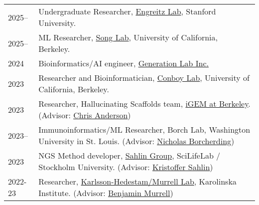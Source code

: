 
\begin{longtable}[l]{@{}p{} p{}}

    2025-- & Undergraduate Researcher, \href{https://www.engreitzlab.org/}{Engreitz Lab}, Stanford University. \\

    2025-- & ML Researcher, \href{https://people.eecs.berkeley.edu/~yss/}{Song Lab}, University of California, Berkeley. \\

    2024 & Bioinformatics/AI engineer, \href{https://www.generationlab.com/}{Generation Lab Inc.} \\

    2023 & Researcher and Bioinformatician, \href{https://conboylab.berkeley.edu/}{Conboy Lab}, University of California, Berkeley. \\

    2023 & Researcher, Hallucinating Scaffolds team, \href{https://igem.studentorg.berkeley.edu/teams/hallucinating-scaffolds/}{iGEM at Berkeley}. (Advisor: \href{https://vcresearch.berkeley.edu/faculty/chris-anderson}{Chris Anderson}) \\

    2023-- & Immunoinformatics/ML Researcher, Borch Lab, Washington University in St. Louis. (Advisor: \href{https://www.borch.dev/}{Nicholas Borcherding}) \\

    2023 & NGS Method developer, \href{https://sahlingroup.github.io/}{Sahlin Group}, SciLifeLab / Stockholm University. (Advisor: \href{https://www.scilifelab.se/researchers/kristoffer-sahlin/}{Kristoffer Sahlin}) \\

    2022-23 & Researcher, \href{https://ki.se/en/people/benjamin-murrell}{Karlsson-Hedestam/Murrell Lab}, Karolinska Institute. (Advisor: \href{https://ki.se/en/people/benjamin-murrell}{Benjamin Murrell}) \\

\end{longtable}
